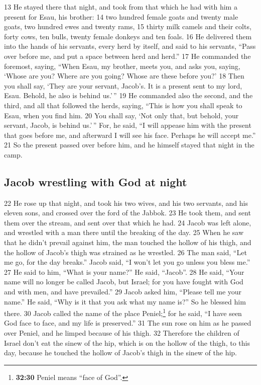 {13} He stayed there that night, and took from that which he had with
him a present for Esau, his brother: {14} two hundred female goats and
twenty male goats, two hundred ewes and twenty rams, {15} thirty milk
camels and their colts, forty cows, ten bulls, twenty female donkeys and
ten foals. {16} He delivered them into the hands of his servants, every
herd by itself, and said to his servants, ``Pass over before me, and put
a space between herd and herd.'' {17} He commanded the foremost, saying,
``When Esau, my brother, meets you, and asks you, saying, `Whose are
you? Where are you going? Whose are these before you?' {18} Then you
shall say, `They are your servant, Jacob's. It is a present sent to my
lord, Esau. Behold, he also is behind us.'\,'' {19} He commanded also
the second, and the third, and all that followed the herds, saying,
``This is how you shall speak to Esau, when you find him. {20} You shall
say, `Not only that, but behold, your servant, Jacob, is behind us.'\,''
For, he said, ``I will appease him with the present that goes before me,
and afterward I will see his face. Perhaps he will accept me.'' {21} So
the present passed over before him, and he himself stayed that night in
the camp.

\hypertarget{jacob-wrestling-with-god-at-night}{%
\subsection{Jacob wrestling with God at
night}\label{jacob-wrestling-with-god-at-night}}

{22} He rose up that night, and took his two wives, and his two
servants, and his eleven sons, and crossed over the ford of the Jabbok.
{23} He took them, and sent them over the stream, and sent over that
which he had. {24} Jacob was left alone, and wrestled with a man there
until the breaking of the day. {25} When he saw that he didn't prevail
against him, the man touched the hollow of his thigh, and the hollow of
Jacob's thigh was strained as he wrestled. {26} The man said, ``Let me
go, for the day breaks.'' Jacob said, ``I won't let you go unless you
bless me.'' {27} He said to him, ``What is your name?'' He said,
``Jacob''. {28} He said, ``Your name will no longer be called Jacob, but
Israel; for you have fought with God and with men, and have prevailed.''
{29} Jacob asked him, ``Please tell me your name.'' He said, ``Why is it
that you ask what my name is?'' So he blessed him there. {30} Jacob
called the name of the place Peniel;\footnote{\textbf{32:30} Peniel
  means ``face of God''.} for he said, ``I have seen God face to face,
and my life is preserved.'' {31} The sun rose on him as he passed over
Peniel, and he limped because of his thigh. {32} Therefore the children
of Israel don't eat the sinew of the hip, which is on the hollow of the
thigh, to this day, because he touched the hollow of Jacob's thigh in
the sinew of the hip.

